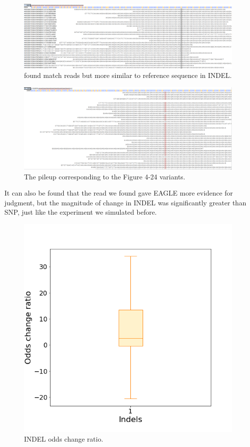 \begin{figure}[H]
    \centering
    \includegraphics[width=1\columnwidth]{body/image/4-24.png}
    \captionsetup{labelfont=bf}
    \renewcommand{\baselinestretch}{1.0}
    \vspace{-1cm}
    \caption[INDEL worse match reads]{ found match reads but more similar to reference sequence in INDEL.}
    \label{f4-24}
\end{figure}

\vspace{0.5cm}
\begin{figure}[H]
    \centering
    \includegraphics[width=1\columnwidth]{body/image/4-25.png}
    \captionsetup{labelfont=bf}
    \renewcommand{\baselinestretch}{1.0}
    \vspace{-1cm}
    \caption[Figure 4.24 pileup]{The pileup corresponding to the Figure 4-24 variants.}
    \label{f4-25}
\end{figure}

It can also be found that the read we found gave EAGLE more evidence for judgment, but the magnitude of change in INDEL was significantly greater than SNP, just like the experiment we simulated before.

\begin{figure}[H]
    \centering
    \includegraphics[width=0.6\columnwidth]{body/image/4-26.png}
    \captionsetup{labelfont=bf}
    \renewcommand{\baselinestretch}{1.0}
    \caption[INDEL odds change ratio]{INDEL odds change ratio.}
    \label{f4-26}
\end{figure}

